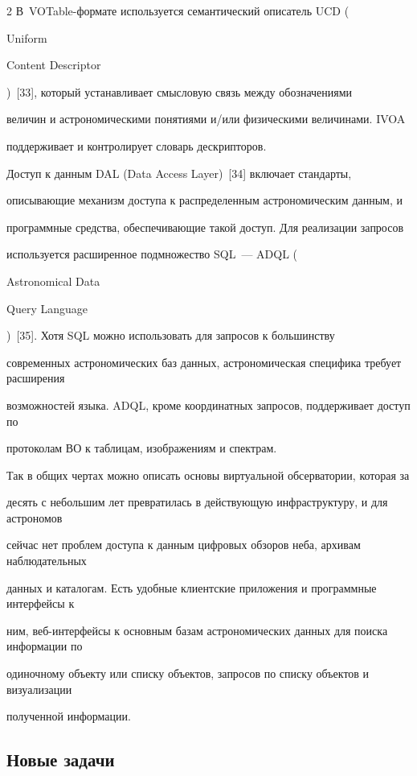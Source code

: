 \begin{multicols}{2}
В~VOTable-фор\-ма\-те используется семантический описатель UCD ({Uniform 

Content Descriptor})~[33], который устанавливает смысловую связь между обозначениями 

величин и астрономическими понятиями и/или физическими величинами. IVOA 

поддерживает и контролирует словарь дескрипторов. 

      

      Доступ к данным DAL ({Data Access Layer})~[34] включает стандарты, 

описывающие механизм доступа к распределенным астрономическим данным, и 

программные средства, обеспечивающие такой доступ. Для реализации запросов 

используется расширенное подмножество SQL~--- ADQL ({Astronomical Data 

Query Language})~[35]. Хотя SQL можно использовать для запросов к большинству 

современных астрономических баз данных, астрономическая специфика требует расширения 

возможностей языка. ADQL, кроме координатных запросов, поддерживает доступ по 

протоколам ВО к таблицам, изображениям и спектрам. 

      

      Так в общих чертах можно описать основы виртуальной обсерватории, которая за 

десять с небольшим лет превратилась в действующую инфраструктуру, и для астрономов 

сейчас нет проблем доступа к данным цифровых обзоров неба, архивам наблюдательных 

данных и каталогам. Есть удобные клиентские приложения и программные интерфейсы к 

ним, веб-интерфейсы к основным базам астрономических данных для поиска информации по 

одиночному объекту или списку объектов, запросов по списку объектов и визуализации 

полученной информации. 



\vspace*{-4pt}

  

\subsection{Новые задачи}




\end{multicols}
